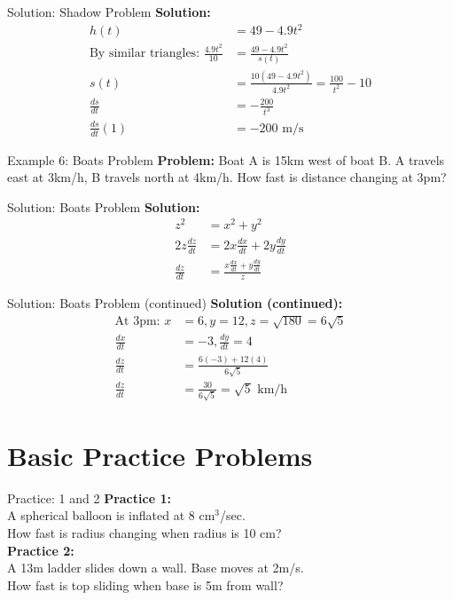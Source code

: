 \documentclass[aspectratio=169]{beamer}
\begin{document}
\begin{frame}{Solution: Shadow Problem}
\textbf{Solution:}
\[
\begin{aligned}
  h(t) &= 49 - 4.9t^2 \\
  \text{By similar triangles: } \frac{4.9t^2}{10} &= \frac{49 - 4.9t^2}{s(t)} \\
  s(t) &= \frac{10(49 - 4.9t^2)}{4.9t^2} = \frac{100}{t^2} - 10 \\
  \frac{ds}{dt} &= -\frac{200}{t^3} \\
  \frac{ds}{dt}(1) &= -200 \text{ m/s}
\end{aligned}
\]
\end{frame}

\begin{frame}{Example 6: Boats Problem}
\textbf{Problem:} Boat A is 15km west of boat B. A travels east at 3km/h, B travels north at 4km/h. How fast is distance changing at 3pm?
\end{frame}

\begin{frame}{Solution: Boats Problem}
\textbf{Solution:}
\[
\begin{aligned}
  z^2 &= x^2 + y^2 \\
  2z\frac{dz}{dt} &= 2x\frac{dx}{dt} + 2y\frac{dy}{dt} \\
  \frac{dz}{dt} &= \frac{x\frac{dx}{dt} + y\frac{dy}{dt}}{z}
\end{aligned}
\]
\end{frame}

\begin{frame}{Solution: Boats Problem (continued)}
\textbf{Solution (continued):}
\[
\begin{aligned}
  \text{At 3pm: } x &= 6, y = 12, z = \sqrt{180} = 6\sqrt{5} \\
  \frac{dx}{dt} &= -3, \frac{dy}{dt} = 4 \\
  \frac{dz}{dt} &= \frac{6(-3) + 12(4)}{6\sqrt{5}} \\
  \frac{dz}{dt} &= \frac{30}{6\sqrt{5}} = \sqrt{5} \text{ km/h}
\end{aligned}
\]
\end{frame}

\section{Basic Practice Problems}

\begin{frame}{Practice: 1 and 2}
\textbf{Practice 1:} \\
A spherical balloon is inflated at 8 cm$^3$/sec. \\
How fast is radius changing when radius is 10 cm? \\
\vspace{1em}
\textbf{Practice 2:} \\
A 13m ladder slides down a wall. Base moves at 2m/s. \\
How fast is top sliding when base is 5m from wall?
\end{frame}
\end{document}
